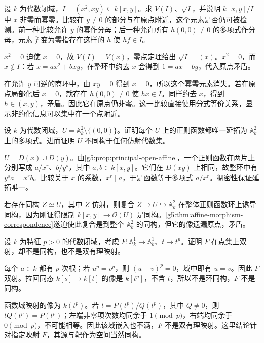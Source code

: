 \BookExercises

\begin{exercise}\label{g5:ex:radical-embedded-model}
	设 \(k\) 为代数闭域，\(I=(x^2,xy)\subseteq k[x,y]\)。求 \(V(I)\)、\(\sqrt I\)，并说明 \(k[x,y]/I\) 中 \(\overline x\) 非零而幂零。比较在 \(y\ne0\) 的部分与在原点附近，这个元素是否仍可被检测。前一种比较允许 \(y\) 的幂作分母；后一种允许所有 \(h(0,0)\ne0\) 的多项式作分母，元素 \(\overline f\) 变为零指存在这样的 \(h\) 使 \(hf\in I\)。
\end{exercise}
\begin{solution}
	\(x^2=0\) 迫使 \(x=0\)，故 \(V(I)=V(x)\)，零点定理给出 \(\sqrt I=(x)\)。\(\overline x^2=0\)，而 \(x\notin I\)：若 \(x=ax^2+bxy\)，在整环中约去 \(x\) 会得到 \(1=ax+by\)，代入原点矛盾。

	在允许 \(y\) 可逆的商环中，由 \(xy=0\) 得到 \(x=0\)，所以这个幂零元素消失。若在原点局部化后 \(x=0\)，就存在 \(h(0,0)\ne0\) 使 \(hx\in I\)。同样约去 \(x\)，得到 \(h\in(x,y)\)，矛盾。因此它在原点仍非零。这一比较直接使用分式等价关系，显示非约化信息可以集中在一个点附近。
\end{solution}

\begin{exercise}\label{g5:ex:punctured-plane-functions}
	设 \(k\) 为代数闭域，\(U=\mathbb A_k^2\setminus\{(0,0)\}\)。证明每个 \(U\) 上的正则函数都唯一延拓为 \(\mathbb A_k^2\) 上的多项式。进而证明 \(U\) 不同构于任何仿射代数集。
\end{exercise}
\begin{solution}
	\(U=D(x)\cup D(y)\)。由\cref{g5:prop:principal-open-affine}，一个正则函数在两片上分别写成 \(a/x^r\)、\(b/y^s\)，其中 \(a,b\in k[x,y]\)。它们在 \(D(xy)\) 上相同，故整环中有 \(y^sa=x^rb\)。比较关于 \(x\) 的系数，\(x^r\mid a\)，于是函数等于多项式 \(a/x^r\)。稠密性保证延拓唯一。

	若存在同构 \(Z\simeq U\)，其中 \(Z\) 仿射，则复合 \(Z\rightarrow U\hookrightarrow\mathbb A_k^2\) 在整体正则函数环上诱导同构，因为刚证得限制 \(k[x,y]\rightarrow\mathcal O(U)\) 是同构。\cref{g5:thm:affine-morphism-correspondence}遂迫使此复合是到整个 \(\mathbb A_k^2\) 的同构，但它的像遗漏原点，矛盾。
\end{solution}

\begin{exercise}\label{g5:ex:positive-characteristic-bijection}
	设 \(k\) 为特征 \(p>0\) 的代数闭域，考虑 \(F:\mathbb A_k^1\rightarrow\mathbb A_k^1\)、\(t\mapsto t^p\)。证明 \(F\) 在点集上双射，却不是同构，也不是双有理映射。
\end{exercise}
\begin{solution}
	每个 \(a\in k\) 都有 \(p\) 次根；若 \(u^p=v^p\)，则 \((u-v)^p=0\)，域中即有 \(u=v\)。因此 \(F\) 双射。拉回同态 \(k[s]\rightarrow k[t]\) 的像是 \(k[t^p]\)，不含 \(t\)，所以不是环同构，\(F\) 不是同构。

	函数域映射的像为 \(k(t^p)\)。若 \(t=P(t^p)/Q(t^p)\)，其中 \(Q\ne0\)，则 \(tQ(t^p)=P(t^p)\)；左端非零项次数均同余于 \(1\pmod p\)，右端均同余于 \(0\pmod p\)，不可能相等。因此该域嵌入也不满，\(F\) 不是双有理映射。这里结论针对指定映射 \(F\)，其源与靶作为空间当然同构。
\end{solution}


